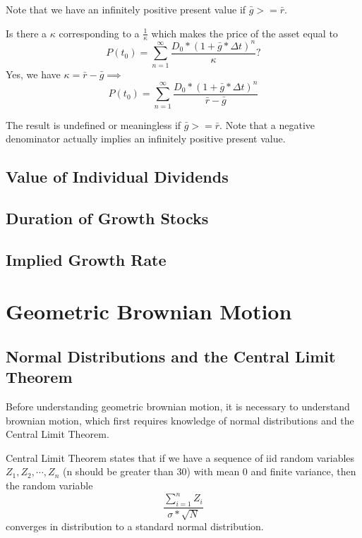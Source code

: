 \documentclass[12pt]{scrartcl}
\begin{document}
\begin{note}
    Note that we have an infinitely positive present value if $\bar{g} >= \bar{r}$.
\end{note}

Is there a  $\kappa$ corresponding to a  $\frac{1}{\kappa}$ which makes the price of the asset equal to 
\[P(t_0) = \sum_{n=1}^\infty \dfrac{D_0 * (1 + \bar{g} * \Delta t)^n}{\kappa}?\]
Yes, we have $\kappa = \bar{r} - \bar{g} \implies$
\[P(t_0) = \sum_{n=1}^\infty \dfrac{D_0 * (1 + \bar{g} * \Delta t)^n}{\bar{r} - \bar{g}}\]
\begin{note}
    The result is undefined or meaningless if $\bar{g} >= \bar{r}$. Note that a negative denominator actually implies an infinitely positive present value.
\end{note}

\subsection{Value of Individual Dividends}

\subsection{Duration of Growth Stocks}

\subsection{Implied Growth Rate}


\section{Geometric Brownian Motion}

\subsection{Normal Distributions and the Central Limit Theorem}

\begin{note}
    Before understanding geometric brownian motion, it is necessary to understand brownian motion, which first requires knowledge of normal distributions and the Central Limit Theorem.
\end{note}

\begin{theorem}
    Central Limit Theorem states that if we have a sequence of iid random variables $Z_1, Z_2, \cdots, Z_n$ (n should be greater than 30) with mean 0 and finite variance, then the random variable
    \[\dfrac{\sum_{i=1}^n Z_i}{\sigma * \sqrt{N}}\]
    converges in distribution to a standard normal distribution.
\end{theorem}
\end{document}
